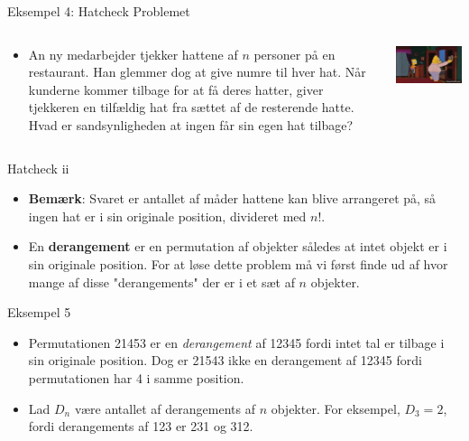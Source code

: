 \documentclass{beamer}
\begin{document}
\begin{frame}{Eksempel 4: Hatcheck Problemet}
\begin{columns}
   \begin{column}{0.5\textwidth}
   \begin{itemize}
       \item  An ny medarbejder tjekker hattene af $n$ personer på en restaurant. Han glemmer dog at give numre til hver hat. Når kunderne kommer tilbage for at få deres hatter, giver tjekkeren en tilfældig hat fra sættet af de resterende hatte. Hvad er sandsynligheden at ingen får sin egen hat tilbage? 
   \end{itemize} 
   \end{column} 
   \begin{column}{0.5\textwidth}
        \includegraphics[scale=0.5]{image.png}
   \end{column} 
\end{columns}
\end{frame}

\begin{frame}{Hatcheck ii}
   \begin{itemize}
       \item \textbf{Bemærk}: Svaret er antallet af måder hattene kan blive arrangeret på, så ingen hat er i sin originale position, divideret med $n!$. 
       \item En \textbf{derangement} er en permutation af objekter således at intet objekt er i sin originale position. For at løse dette problem må vi først finde ud af hvor mange af disse "derangements" der er i et sæt af $n$ objekter.
   \end{itemize} 
\end{frame}

\begin{frame}{Eksempel 5}
   \begin{itemize}
       \item Permutationen 21453 er en \textit{derangement} af 12345 fordi intet tal er tilbage i sin originale position. Dog er 21543 ikke en derangement af 12345 fordi permutationen har 4 i samme position. 
       \item Lad $D_n$ være antallet af derangements af $n$ objekter. For eksempel, $D_3 = 2$, fordi derangements af 123 er 231 og 312. 
   \end{itemize} 
\end{frame}
\end{document}
